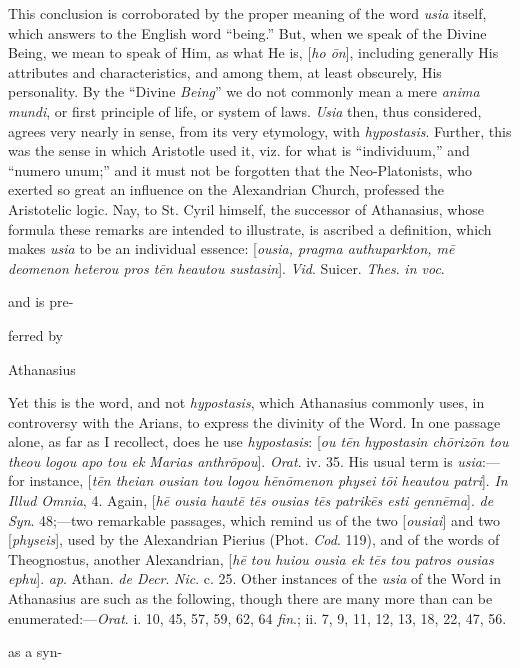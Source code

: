 This conclusion is corroborated by the
proper meaning of the word \emph{usia} itself, which answers
to the English word ``being.'' But, when we speak of the Divine
Being, we mean to speak of Him, as what He is, [\emph{ho \={o}n}],
including generally His attributes and characteristics, and
among them, at least obscurely, His personality. By the ``Divine
\emph{Being}'' we do not commonly mean a mere \emph{anima mundi},
or first principle of life, or system of laws. \emph{Usia}
then, thus considered, agrees very nearly in sense, from its
very etymology, with \emph{hypostasis}. Further, this was the
sense in which Aristotle used it, viz. for what is ``individuum,''
and ``numero unum;'' and it must not be forgotten that the
Neo-Platonists, who exerted so great an influence on the
Alexandrian Church, professed the Aristotelic logic. Nay, to
St. Cyril himself, the successor of Athanasius, whose formula
these remarks are intended to illustrate, is ascribed a
definition, which makes \emph{usia} to be an individual
essence: [\emph{ousia, pragma authuparkton, m\={e} deomenon
heterou pros t\={e}n heautou sustasin}]. \emph{Vid}.
Suicer. \emph{Thes}. \emph{in voc}.

and is pre-

ferred by

Athanasius

Yet this is the word, and not \emph{hypostasis},
which Athanasius commonly uses, in controversy with the
Arians, to express the divinity of the Word. In one passage
alone, as far as I recollect, does he use \emph{hypostasis}: [\emph{ou
t\={e}n hypostasin ch\={o}riz\={o}n tou theou logou
apo tou ek Marias anthr\={o}pou}]. \emph{Orat}. iv. 35.
His usual term is \emph{usia}:—for instance, [\emph{t\={e}n
theian ousian tou logou h\={e}n\={o}menon physei t\={o}i
heautou patri}]. \emph{In Illud Omnia}, 4. Again, [\emph{h\={e}
ousia haut\={e} t\={e}s ousias t\={e}s patrik\={e}s
esti genn\={e}ma}]. \emph{de Syn}. 48;—two remarkable
passages, which remind us of the two [\emph{ousiai}] and two [\emph{physeis}],
used by the Alexandrian Pierius (Phot. \emph{Cod}. 119), and
of the words of Theognostus, another Alexandrian, [\emph{h\={e}
tou huiou ousia ek t\={e}s tou patros ousias ephu}]. \emph{ap}.
Athan. \emph{de Decr}. \emph{Nic}. c. 25. Other instances of
the \emph{usia} of the Word in Athanasius are such as the
following, though there are many more than can be
enumerated:—\emph{Orat}. i. 10, 45, 57, 59, 62, 64 \emph{fin}.;
ii. 7, 9, 11, 12, 13, 18, 22, 47, 56.

as a syn-

